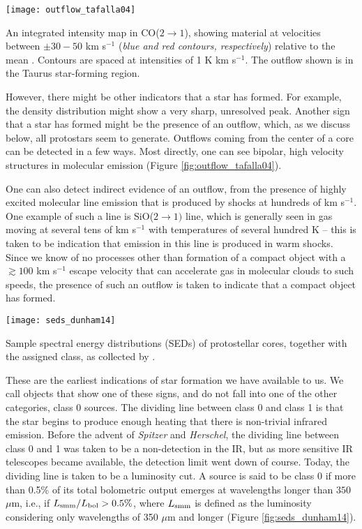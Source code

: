 \begin{marginfigure}
\texttt{[image: outflow\_tafalla04]}
\caption[Outflow in CO($2\rightarrow 1$)]{
\label{fig:outflow_tafalla04}
An integrated intensity map in CO($2\rightarrow 1$), showing material at velocities between $\pm 30-50$ km s$^{-1}$ (\textit{blue and red contours, respectively}) relative to the mean \citep{tafalla04c}. Contours are spaced at intensities of 1 K km s$^{-1}$. The outflow shown is in the Taurus star-forming region.
}
\end{marginfigure}

However, there might be other indicators that a star has formed. For example, the density distribution might show a very sharp, unresolved peak. Another sign that a star has formed might be the presence of an outflow, which, as we discuss below, all protostars seem to generate. Outflows coming from the center of a core can be detected in a few ways. Most directly, one can see bipolar, high velocity structures in molecular emission (Figure \ref{fig:outflow_tafalla04}).

One can also detect indirect evidence of an outflow, from the presence of highly excited molecular line emission that is produced by shocks at hundreds of km s$^{-1}$. One example of such a line is SiO($2\rightarrow 1)$ line, which is generally seen in gas moving at several tens of km s$^{-1}$ with temperatures of several hundred K -- this is taken to be indication that emission in this line is produced in warm shocks. Since we know of no processes other than formation of a compact object with a $\gtrsim 100$ km s$^{-1}$ escape velocity that can accelerate gas in molecular clouds to such speeds, the presence of such an outflow is taken to indicate that a compact object has formed.

\begin{marginfigure}
\texttt{[image: seds\_dunham14]}
\caption[Sample SEDs of protostellar cores]{
\label{fig:seds_dunham14}
Sample spectral energy distributions (SEDs) of protostellar cores, together with the assigned class, as collected by \citet{dunham14a}.
}
\end{marginfigure}

These are the earliest indications of star formation we have available to us. We call objects that show one of these signs, and do not fall into one of the other categories, class 0 sources. The dividing line between class 0 and class 1 is that the star begins to produce enough heating that there is non-trivial infrared emission. Before the advent of \textit{Spitzer} and \textit{Herschel}, the dividing line between class 0 and 1 was taken to be a non-detection in the IR, but as more sensitive IR telescopes became available, the detection limit went down of course. Today, the dividing line is taken to be a luminosity cut. A source is said to be class 0 if more than 0.5\% of its total bolometric output emerges at wavelengths longer than $350$ $\mu$m, i.e., if $L_{\rm smm} / L_{\rm bol} > 0.5\%$, where $L_{\rm smm}$ is defined as the luminosity considering only wavelengths of 350 $\mu$m and longer (Figure \ref{fig:seds_dunham14}).

